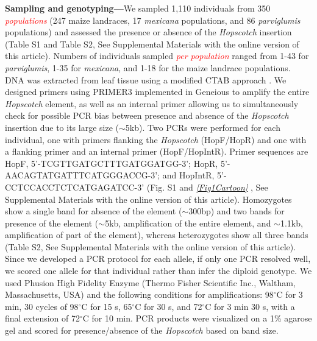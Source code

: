\documentclass[11pt]{article} %
\newcommand{\track}[1]{\textcolor{red}{\emph{\normalsize #1}} }
\begin{document}
\begin{linenumbers}
\begin{flushleft}
\textbf{Sampling and genotyping---}We sampled 1,110 individuals from 350 \track{populations} (247 maize landraces, 17 \emph{mexicana} populations, and 86 \emph{parviglumis} populations) and assessed the presence or absence of the \emph{Hopscotch} insertion (Table S1 and Table S2, See Supplemental Materials with the online version of this article). Numbers of individuals sampled \track{per population} ranged from 1-43 for \emph{parviglumis}, 1-35 for \emph{mexicana}, and 1-18 for the maize landrace populations. DNA was extracted from leaf tissue using a modified CTAB approach \citep{DoyleDoyle1990, Maloof1984}. We designed primers using PRIMER3 \citep{RozenSkaletsky2000} implemented in Geneious \citep{Kearse2012} to amplify the entire \emph{Hopscotch} element, as well as an internal primer allowing us to simultaneously check for possible PCR bias between presence and absence of the \emph{Hopscotch} insertion due to its large size ($\sim$5kb). Two PCRs were performed for each individual, one with primers flanking the \emph{Hopscotch} (HopF/HopR) and one with a flanking primer and an internal primer (HopF/HopIntR). Primer sequences are HopF, {\small 5'-TCGTTGATGCTTTGATGGATGG-3'}; 
HopR, {\small 5'-AACAGTATGATTTCATGGGACCG-3'}; and HopIntR, {\small  5'-CCTCCACCTCTCATGAGATCC-3'} (Fig. S1 and \track{\ref{Fig1Cartoon}}, See Supplemental Materials with the online version of this article). Homozygotes show a single band for absence of the element ($\sim$300bp) and two bands for presence of the element ($\sim$5kb, amplification of the entire element, and $\sim$1.1kb, amplification of part of the element), whereas heterozygotes show all three bands (Table S2, See Supplemental Materials with the online version of this article). Since we developed a PCR protocol for each allele, if only one PCR resolved well, we scored one allele for that individual rather than infer the diploid genotype. We used Phusion High Fidelity Enzyme (Thermo Fisher Scientific Inc., Waltham, Massachusetts, USA) and the following conditions for amplifications: 98$^{\circ}$C for 3 min, 30 cycles of 98$^{\circ}$C for 15 s, 65$^{\circ}$C for 30 s, and 72$^{\circ}$C for 3 min 30 s, with a final extension of 72$^{\circ}$C for 10 min. PCR products were visualized on a 1\% agarose gel and scored for presence/absence of the \emph{Hopscotch} based on band size.


\end{flushleft}
\end{linenumbers}
\end{document}

